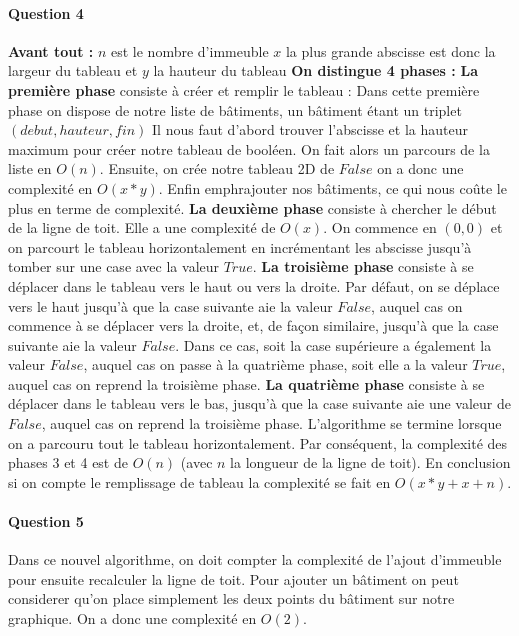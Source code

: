 \documentclass[a4paper,10pt]{article}
\begin{document}
\paragraph{Question 4}
\textbf{Avant tout :} $n$ est le nombre d'immeuble $x$ la plus grande abscisse est donc la largeur du tableau et $y$ la hauteur du tableau\newline
\textbf{On distingue 4 phases :} \newline
\textbf{La première phase} consiste à créer et remplir le tableau :\newline
Dans cette première phase on dispose de notre liste de bâtiments, un bâtiment étant un triplet $(debut, hauteur, fin)$\newline
Il nous faut d'abord trouver l'abscisse et la hauteur maximum pour créer notre tableau de booléen. On fait alors un parcours de la liste en $O(n)$. 
Ensuite, on crée notre tableau 2D de $False$ on a donc une complexité en $O(x*y)$.
Enfin emph{rajouter nos bâtiments, ce qui nous coûte le plus} en terme de complexité. 
\textbf{La deuxième phase} consiste à chercher le début de la ligne de toit. Elle a une complexité de $O(x)$. On commence en $(0,0)$ et 
on parcourt le tableau horizontalement en incrémentant les abscisse jusqu'à tomber sur une case avec la valeur $True$.\newline
\textbf{La troisième phase} consiste à se déplacer dans le tableau vers le haut ou vers la droite. Par défaut, on se déplace vers le haut jusqu'à que la case suivante aie la valeur $False$, 
auquel cas on commence à se déplacer vers la droite, et, de façon similaire, jusqu'à que la case suivante aie la valeur $False$. 
Dans ce cas, soit la case supérieure a également la valeur $False$, auquel cas on passe à la quatrième phase, soit elle a la valeur $True$, auquel cas on reprend la troisième phase.\newline
\textbf{La quatrième phase} consiste à se déplacer dans le tableau vers le bas, jusqu'à que la case suivante aie une valeur de $False$, auquel cas on reprend la troisième phase.\newline
L'algorithme se termine lorsque on a parcouru tout le tableau horizontalement.\newline
Par conséquent, la complexité des phases 3 et 4 est de $O(n)$ (avec $n$ la longueur de la ligne de toit).
En conclusion si on compte le remplissage de tableau la complexité se fait en $O(x*y + x + n)$.
\paragraph{Question 5}
Dans ce nouvel algorithme, on doit compter la complexité de l'ajout d'immeuble pour ensuite recalculer la ligne de toit.
Pour ajouter un bâtiment on peut considerer qu'on place simplement les deux points du bâtiment sur notre graphique. 
On a donc une complexité en $O(2)$.
\end{document}
